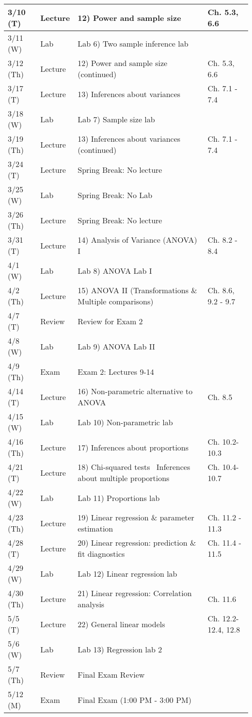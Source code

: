 \documentclass{article}
\begin{document}
\begin{center}
\begin{tabular}{|p{2cm}|p{1.5cm}|p{9cm}|p{2.9cm}|}
		3/10 (T) & Lecture & 12) Power and sample size & Ch. 5.3, 6.6 \\ \hline
		3/11 (W) & Lab & Lab 6) Two sample inference lab & \\ \hline 
		3/12 (Th) & Lecture & 12) Power and sample size (continued) & Ch. 5.3, 6.6 \\ \hline
		3/17 (T) & Lecture & 13) Inferences about variances & Ch. 7.1 - 7.4 \\ \hline
		3/18 (W) & Lab & Lab 7) Sample size lab & \\ \hline 
		3/19 (Th) & Lecture & 13) Inferences about variances (continued) & Ch. 7.1 - 7.4 \\ \hline
		3/24 (T) & Lecture & Spring Break: No lecture &  \\ \hline
		3/25 (W) & Lab & Spring Break: No Lab & \\ \hline 
		3/26 (Th) & Lecture & Spring Break: No lecture &  \\ \hline
		3/31 (T) & Lecture & 14) Analysis of Variance (ANOVA) I & Ch. 8.2 - 8.4 \\ \hline
		4/1 (W) & Lab & Lab 8) ANOVA Lab I & \\ \hline
		4/2 (Th) & Lecture & 15) ANOVA II (Transformations \& Multiple comparisons) & Ch. 8.6, 9.2 - 9.7 \\ \hline
		4/7 (T) & Review & Review for Exam 2 & \\ \hline
		4/8 (W) & Lab & Lab 9) ANOVA Lab II & \\ \hline
		4/9 (Th) & Exam & Exam 2: Lectures 9-14 & \\ \hline
		4/14 (T) & Lecture & 16) Non-parametric alternative to ANOVA & Ch. 8.5 \\ \hline
		4/15 (W) & Lab & Lab 10) Non-parametric lab  & \\ \hline
		4/16 (Th) & Lecture & 17) Inferences about proportions & Ch. 10.2-10.3 \\ \hline
		4/21 (T) & Lecture & 18)  Chi-squared tests \ Inferences about multiple proportions & Ch. 10.4-10.7 \\ \hline
		4/22 (W) & Lab & Lab 11) Proportions lab & \\ \hline
		4/23 (Th) & Lecture & 19) Linear regression \& parameter estimation & Ch. 11.2 - 11.3 \\ \hline
		4/28 (T) & Lecture & 20) Linear regression: prediction \& fit diagnostics & Ch. 11.4 - 11.5 \\ \hline
		4/29 (W) & Lab & Lab 12) Linear regression lab & \\ \hline
		4/30 (Th) & Lecture & 21) Linear regression: Correlation analysis & Ch. 11.6 \\ \hline
		5/5 (T) & Lecture & 22) General linear models & Ch. 12.2-12.4, 12.8 \\ \hline
		5/6 (W) & Lab & Lab 13) Regression lab 2 & \\ \hline
		5/7 (Th) & Review & Final Exam Review & \\ \hline
		5/12 (M) & Exam &  Final Exam (1:00 PM - 3:00 PM) & \\ \hline
	\end{tabular}
\end{center}
\end{document}
